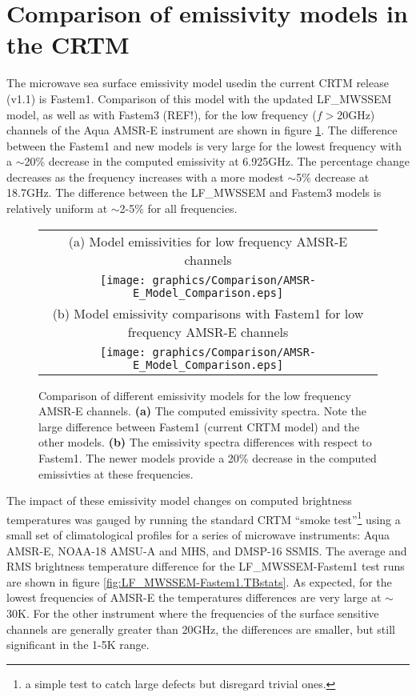 \section{Comparison of emissivity models in the CRTM}

The microwave sea surface emissivity model usedin the current CRTM release (v1.1) is Fastem1\citep{Fastem1}. Comparison of this model with the updated LF\_MWSSEM model, as well as with Fastem3 (REF!), for the low frequency ($f\!>$20GHz) channels of the Aqua AMSR-E instrument are shown in figure \ref{fig:AMSR-E_Model_Comparison}. The difference between the Fastem1 and new models is very large for the lowest frequency with a $\sim$20\% decrease in the computed emissivity at 6.925GHz. The percentage change decreases as the frequency increases with a more modest $\sim$5\% decrease at 18.7GHz. The difference between the LF\_MWSSEM and Fastem3 models is relatively uniform at $\sim$2-5\% for all frequencies.

\begin{figure}[htp]
  \centering
  \begin{tabular}{c}
    \textsf{(a) Model emissivities for low frequency AMSR-E channels}\\
    \texttt{[image: graphics/Comparison/AMSR-E\_Model\_Comparison.eps]}\\
    \textsf{(b) Model emissivity comparisons with Fastem1 for low frequency AMSR-E channels}\\
    \texttt{[image: graphics/Comparison/AMSR-E\_Model\_Comparison.eps]}
  \end{tabular}
  \caption{Comparison of different emissivity models for the low frequency AMSR-E channels. \textbf{(a)} The computed emissivity spectra. Note the large difference between Fastem1 (current CRTM model) and the other models. \textbf{(b)} The emissivity spectra differences with respect to Fastem1. The newer models provide a 20\% decrease in the computed emissivties at these frequencies.}
  \label{fig:AMSR-E_Model_Comparison}
\end{figure}

The impact of these emissivity model changes on computed brightness temperatures was gauged by running the standard CRTM ``smoke test''\footnote{a simple test to catch large defects but disregard trivial ones.} using a small set of climatological profiles for a series of microwave instruments: Aqua AMSR-E, NOAA-18 AMSU-A and MHS, and DMSP-16 SSMIS. The average and RMS brightness temperature difference for the LF\_MWSSEM-Fastem1 test runs are shown in figure \ref{fig:LF_MWSSEM-Fastem1.TBstats}. As expected, for the lowest frequencies of AMSR-E the temperatures differences are very large at $\sim$30K. For the other instrument where the frequencies of the surface sensitive channels are generally greater than 20GHz, the differences are smaller, but still significant in the 1-5K range.

